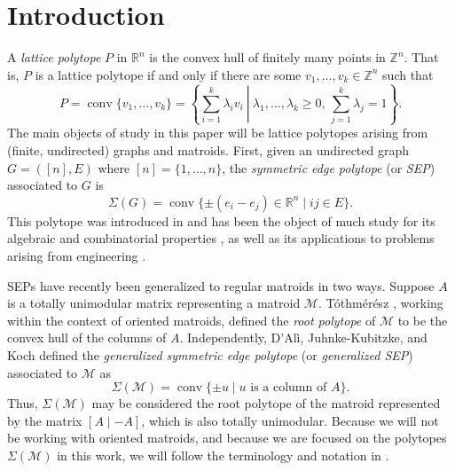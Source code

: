 \documentclass{amsart}
\numberwithin{equation}{section}
\theoremstyle{plain}
\theoremstyle{definition}
\DeclareMathOperator{\conv}{conv}
\newcommand{\RR}{\mathbb{R}}
\newcommand{\ZZ}{\mathbb{Z}}
\newcommand{\calM}{\mathcal{M}}
\begin{document}
\maketitle

\section{Introduction}
    A \emph{lattice polytope} $P$ in $\RR^n$ is the convex hull of finitely many points in $\ZZ^n$.
    That is, $P$ is a lattice polytope if and only if there are some $v_1,\dots,v_k \in \ZZ^n$ such that
    \[
        P = \conv\{v_1,\dots,v_k\} = \left\{
        \left.\sum_{i=1}^k \lambda_iv_i \ \right| \ \lambda_1,\dots,\lambda_k \geq 0, \, \sum_{j=1}^k \lambda_j = 1\right\}.
    \]
    The main objects of study in this paper will be lattice polytopes arising from (finite, undirected) graphs and matroids.    
    First, given an undirected graph $G = ([n],E)$ where $[n] = \{1,\dots,n\}$, the \emph{symmetric edge polytope} (or \emph{SEP}) associated to $G$ is
    \[
        \Sigma(G) = \conv\{\pm(e_i - e_j) \in \RR^n \mid ij \in E\}.
    \]
    This polytope was introduced in \cite{MHNOH} and has been the object of much study for its algebraic and combinatorial properties \cite{DDM, HJM, OhsugiHibi, OhsugiTsuchiya21}, as well as its applications to problems arising from engineering \cite{Chen, ChenDavisKorchevskaia, ChenDavisMehta}.

    SEPs have recently been generalized to regular matroids in two ways.
    Suppose $A$ is a totally unimodular matrix representing a matroid $\calM$.
    T\'othm\'er\'esz \cite{Tothmeresz}, working within the context of oriented matroids, defined the \emph{root polytope} of $\calM$ to be the convex hull of the columns of $A$.
    Independently, D'Al\`i, Juhnke-Kubitzke, and Koch \cite{DJKK} defined the \emph{generalized symmetric edge polytope} (or \emph{generalized SEP}) associated to $\calM$ as 
    \[
        \Sigma(\calM)= \conv\{\pm u \mid u \text{ is a column of }A\}.
    \]
    Thus, $\Sigma(\calM)$ may be considered the root polytope of the matroid represented by the matrix $[A \mid -A]$, which is also totally unimodular.
    Because we will not be working with oriented matroids, and because we are focused on the polytopes $\Sigma(\calM)$ in this work, we will follow the terminology and notation in \cite{DJKK}.
    
\end{document}
